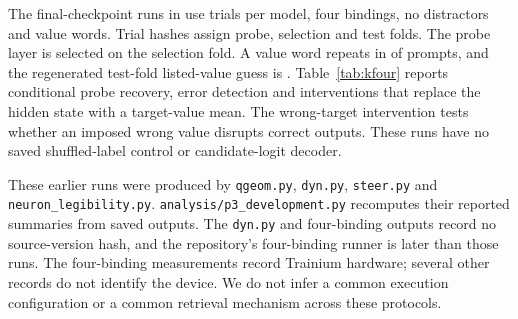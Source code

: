 \documentclass{article}
\begin{document}
\begin{table}[t]
\centering
\caption{Earlier Pythia-1.4B wrong-output groups on \DvPostN{} test trials per checkpoint.
Probe right uses the six listed values.
Output high means gold-value probability of at least one sixth over those values; output low means less.}
\label{tab:errors}
\small

\end{table}

The final-checkpoint runs in \citet{legible2609} use \DvKfTrials{} trials per model, four bindings, no distractors and \DvKfValues{} value words.
Trial hashes assign probe, selection and test folds.
The probe layer is selected on the selection fold.
A value word repeats in \DvKfRepeat{} of prompts, and the regenerated test-fold listed-value guess is \DvKfBase{}.
Table~\ref{tab:kfour} reports conditional probe recovery, error detection and interventions that replace the hidden state with a target-value mean.
The wrong-target intervention tests whether an imposed wrong value disrupts correct outputs.
These runs have no saved shuffled-label control or candidate-logit decoder.

\begin{table}[!htbp]
\centering
\caption{Earlier final-checkpoint probes and interventions with four bindings and no distractors.
Probe on wrong: conditional recovery with Wilson 95\% intervals.
Gold and probe repair: fractions of wrong outputs corrected by replacing the state with the relevant value mean.
Wrong value keeps correct: fraction of correct outputs surviving replacement by another value mean.
AUROC uses one minus the probe's probability for the model's emitted value.}
\label{tab:kfour}
\small

\end{table}

These earlier runs were produced by \texttt{qgeom.py}, \texttt{dyn.py}, \texttt{steer.py} and \texttt{neuron\_legibility.py}.
\texttt{analysis/p3\_development.py} recomputes their reported summaries from saved outputs.
The \texttt{dyn.py} and four-binding outputs record no source-version hash, and the repository's four-binding runner is later than those runs.
The four-binding measurements record Trainium hardware; several other records do not identify the device.
We do not infer a common execution configuration or a common retrieval mechanism across these protocols.
\end{document}
